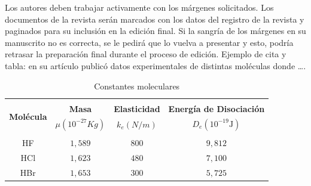 \documentclass[10.5 pt, twocolumn]{article}
\begin{document}
Los autores deben trabajar activamente con los márgenes solicitados. Los documentos de la revista serán marcados con los datos del registro de la revista y paginados para su inclusión en la edición final. Si la sangría de los márgenes en su manuscrito no es correcta, se le pedirá que lo vuelva a presentar y esto, podría retrasar la preparación final durante el proceso de edición. Ejemplo de cita y tabla: \textcite{young1964synthetic} en su artículo publicó datos experimentales de distintas moléculas donde \ldots. \\

\begin{table}[!ht]
    \footnotesize %
        \begin{center}
            \caption{Constantes moleculares \\[-0.3cm]} %
            \begin{tabular}{c c c c}
                \hline
                \\[-0.3cm]
                \multirow{2}{*}{{\bf Molécula}} &  {\bf Masa}  &  {\bf Elasticidad}  &   {\bf Energía de Disociación}  \\ [-1pt]
                & $ {\mu (10^ {-27} Kg)}$ & $ k_e (N/m)$ & ${ D_e (10^ {-19} \text{J})}$ \\[1pt]
                \hline 
                \\[-0.3cm]
                 HF & $1,589$ & $800$ & $9,812$ \\ [-1pt]
                 HCl & $1,623$ & $480$ & $7,100$ \\ [-1pt]
                 HBr & $1,653$ &  $300$ & $5,725$ \\  [-1.5pt]
                \hline
            \end{tabular} 
            \label{fig1-constantes-moleculares}
        \end{center}
\end{table}
\vspace{1cm} %
\end{document}
